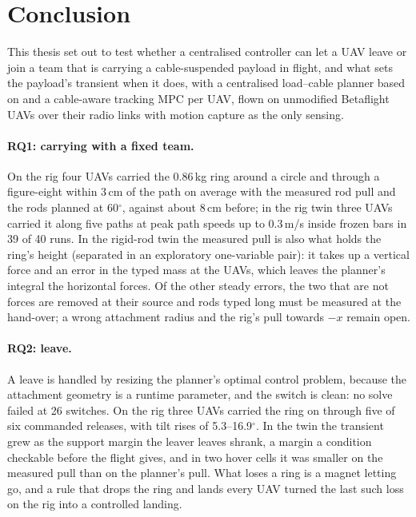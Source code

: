\section{Conclusion}
\label{sec:conclusion}


This thesis set out to test whether a centralised controller can let a UAV leave or join a team that is carrying a
cable-suspended payload in flight, and what sets the payload's transient when it does, with a centralised
load--cable planner based on \cite{tudelft} and a cable-aware tracking MPC per UAV, flown on unmodified Betaflight
UAVs over their radio links with motion capture as the only sensing.

\paragraph{RQ1: carrying with a fixed team.} On the rig four UAVs carried the 0.86\,kg ring around a circle and
through a figure-eight within 3\,cm of the path on average with the measured rod pull and the rods planned at
60$^\circ$, against about 8\,cm before; in the rig twin three UAVs carried it along five paths at peak path speeds up
to 0.3\,m/s inside frozen bars in 39 of 40 runs. In the rigid-rod twin the measured pull is also what holds the ring's
height (separated in an exploratory one-variable pair): it takes up a vertical force and an error in the typed mass at the UAVs, which leaves the planner's integral
the horizontal forces. Of the other steady errors, the two that are not forces are removed at their source and rods
typed long must be measured at the hand-over; a wrong attachment radius and the rig's pull towards $-x$ remain open.

\paragraph{RQ2: leave.} A leave is handled by resizing the planner's optimal control problem, because the attachment
geometry is a runtime parameter, and the switch is clean: no solve failed at 26 switches. On the rig three UAVs
carried the ring on through five of six commanded releases, with tilt rises of 5.3--16.9$^\circ$. In the twin the
transient grew as the support margin the leaver leaves shrank, a margin a condition checkable before the flight gives,
and in two hover cells it was smaller on the measured pull than on the planner's pull. What loses a ring is a magnet letting go, and a rule that drops the ring and lands every UAV turned the last
such loss on the rig into a controlled landing.

